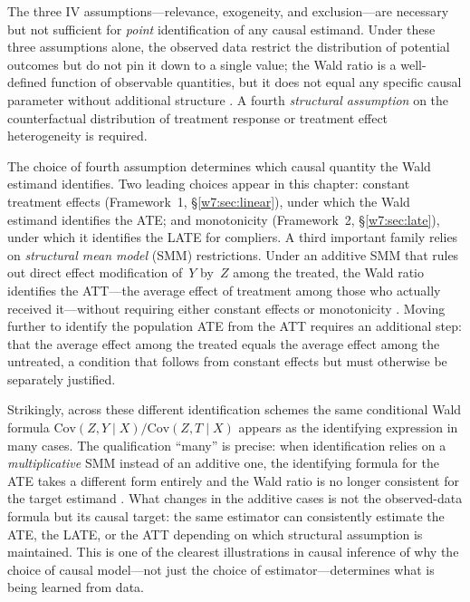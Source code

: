\documentclass[master.tex]{subfiles}
\begin{document}
\begin{remark}
\label{w7:rem:three-not-enough}
The three IV assumptions---relevance, exogeneity, and exclusion---are
necessary but not sufficient for \emph{point} identification of any
causal estimand.  Under these three assumptions alone, the observed
data restrict the distribution of potential outcomes but do not pin it
down to a single value; the Wald ratio is a well-defined function of
observable quantities, but it does not equal any specific causal
parameter without additional structure
\citep{hernan2006instruments, levis2024nonparametric}.
A fourth \emph{structural assumption} on the counterfactual
distribution of treatment response or treatment effect heterogeneity
is required.

The choice of fourth assumption determines which causal quantity the
Wald estimand identifies.  Two leading choices appear in this chapter:
constant treatment effects (Framework~1, \S\ref{w7:sec:linear}), under
which the Wald estimand identifies the ATE; and monotonicity
(Framework~2, \S\ref{w7:sec:late}), under which it identifies the LATE
for compliers.  A third important family relies on \emph{structural
mean model} (SMM) restrictions.  Under an additive SMM that rules
out direct effect modification of~$Y$ by~$Z$ among the treated,
the Wald ratio identifies the ATT---the average effect of treatment
among those who actually received it---without requiring either
constant effects or monotonicity \citep{hernan2006instruments,
levis2024nonparametric}.  Moving further to identify the population
ATE from the ATT requires an additional step: that the average effect
among the treated equals the average effect among the untreated, a
condition that follows from constant effects but must otherwise be
separately justified.

Strikingly, across these different identification schemes the same
conditional Wald formula
$\mathrm{Cov}(Z, Y \mid X)/\mathrm{Cov}(Z, T \mid X)$ appears as
the identifying expression in many cases.  The qualification
``many'' is precise: when identification relies on a
\emph{multiplicative} SMM instead of an additive one, the identifying
formula for the ATE takes a different form entirely and the Wald ratio
is no longer consistent for the target estimand
\citep{hernan2006instruments}.  What changes in the additive cases is
not the observed-data formula but its causal target: the same
estimator can consistently estimate the ATE, the LATE, or the ATT
depending on which structural assumption is maintained.  This is
one of the clearest illustrations in causal inference of why the
choice of causal model---not just the choice of estimator---determines
what is being learned from data.


\end{remark}
\end{document}
